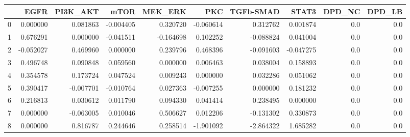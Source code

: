 \begin{tabular}{lrrrrrrrrr}
\toprule
{} &      EGFR &  PI3K\_AKT &      mTOR &   MEK\_ERK &       PKC &  TGFb-SMAD &     STAT3 &  DPD\_NC &  DPD\_LB \\
\midrule
0 &  0.000000 &  0.081863 & -0.004405 &  0.320720 & -0.060614 &   0.312762 &  0.001874 &     0.0 &     0.0 \\
1 &  0.676291 &  0.000000 & -0.041511 & -0.164698 &  0.102252 &  -0.088824 &  0.041004 &     0.0 &     0.0 \\
2 & -0.052027 &  0.469960 &  0.000000 &  0.239796 &  0.468396 &  -0.091603 & -0.047275 &     0.0 &     0.0 \\
3 &  0.496748 &  0.090848 &  0.059560 &  0.000000 &  0.006463 &   0.038004 &  0.158893 &     0.0 &     0.0 \\
4 &  0.354578 &  0.173724 &  0.047524 &  0.009243 &  0.000000 &   0.032286 &  0.051062 &     0.0 &     0.0 \\
5 &  0.390417 & -0.007701 & -0.010764 &  0.027363 & -0.007255 &   0.000000 &  0.181232 &     0.0 &     0.0 \\
6 &  0.216813 &  0.030612 &  0.011790 &  0.094330 &  0.041414 &   0.238495 &  0.000000 &     0.0 &     0.0 \\
7 &  0.000000 & -0.063005 &  0.010046 &  0.506627 &  0.012206 &  -0.131302 &  0.330873 &     0.0 &     0.0 \\
8 &  0.000000 &  0.816787 &  0.244646 &  0.258514 & -1.901092 &  -2.864322 &  1.685282 &     0.0 &     0.0 \\
\bottomrule
\end{tabular}
